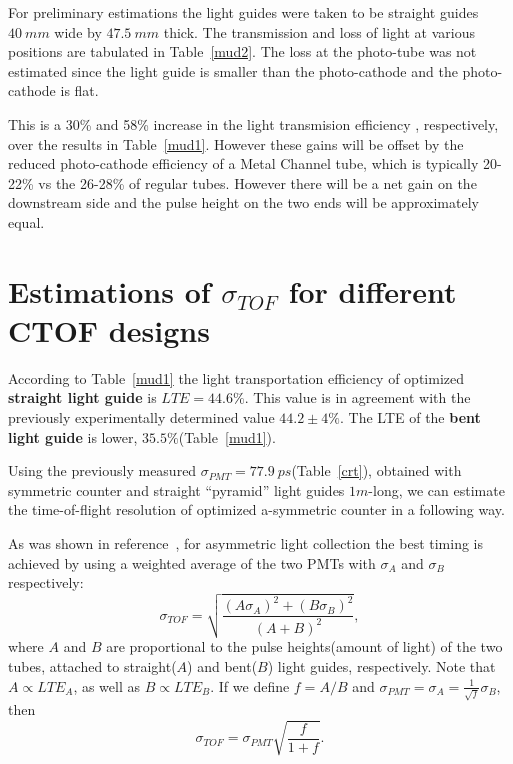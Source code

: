 For preliminary estimations 
the light guides were taken to be straight guides 
$40~mm$ wide by $47.5~mm$ thick.
The transmission and loss of light at various positions 
are tabulated in Table~\ref{mud2}.
The loss at the photo-tube was not estimated since the 
light guide is smaller than the photo-cathode and the photo-cathode is flat.


This is a 30\% and 58\% increase in the light transmision efficiency
, respectively, over the results in Table~\ref{mud1}. 
However these gains will be offset by 
the reduced photo-cathode efficiency of a Metal Channel tube, which is 
typically 20-22\% vs the 26-28\% of regular tubes.
However there will be a net gain on the downstream side  
and the pulse height on the two ends will be approximately equal. 


\section{Estimations of $\sigma_{TOF}$ for different CTOF  designs}
\label{estimates}
According to Table~\ref{mud1}
the  light transportation efficiency of optimized \textbf{straight  
light guide} is $LTE=44.6\%$. This value is in agreement with the 
previously experimentally determined value  $44.2 \pm 4\% $.
The  LTE of the  \textbf{bent light guide} is lower,
 $35.5\%$(Table~\ref{mud1}).

	Using the previously measured $\sigma_{PMT}=77.9~ps$(Table~\ref{crt}), obtained 
 with symmetric counter and  straight ``pyramid'' light guides $1m$-long, 
we   can   estimate the time-of-flight 
resolution of optimized a-symmetric counter in a following way.

As was  shown in reference~\cite{r4}, for asymmetric light collection 
the best timing is achieved by using a weighted average of the two PMTs 
 with $\sigma_{A}$ and $\sigma_{B}$ respectively:
%
\begin{equation}
\sigma_{TOF}=\sqrt{\frac{(A\sigma_{A})^2+(B\sigma_{B})^2}{(A+B)^2}},
\label{eq0}
\end{equation}
%
where $A$ and $B$ are proportional to the pulse heights(amount of light) of the two tubes, 
attached to straight($A$) and bent($B$) light guides, respectively.
 Note that $A \propto LTE_A$, as well as  $B \propto LTE_B$.
If we define $f = A/B$ and $\sigma_{PMT}=\sigma_{A}= \frac{1}{\sqrt{f}}\sigma_{B}$, then
%
\begin{equation}
\sigma_{TOF}=\sigma_{PMT}\sqrt{\frac{f}{1+f}}.
\label{eq1}
\end{equation}
%

